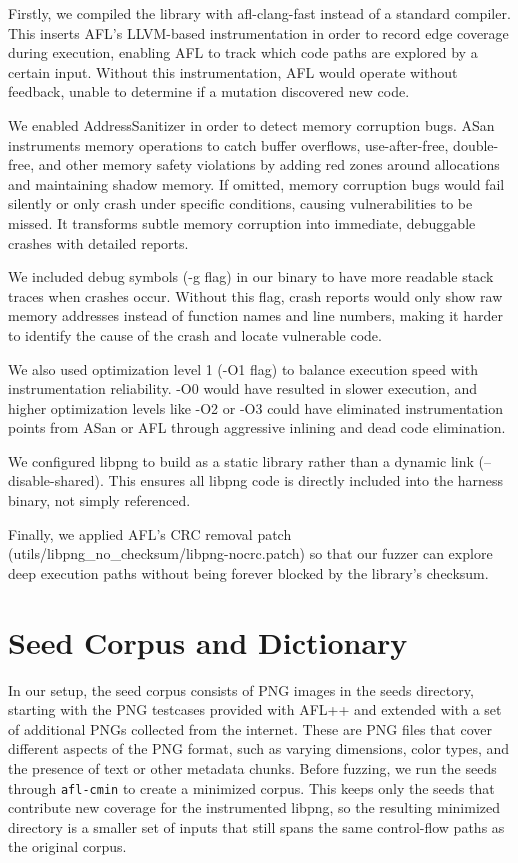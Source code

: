 Firstly, we compiled the library with afl-clang-fast instead of a standard compiler. This inserts AFL's LLVM-based instrumentation in order to record edge coverage during execution, enabling AFL to track which code paths are explored by a certain input. Without this instrumentation, AFL would operate without feedback, unable to determine if a mutation discovered new code.

We enabled AddressSanitizer in order to detect memory corruption bugs. ASan instruments memory operations to catch buffer overflows, use-after-free, double-free, and other memory safety violations by adding red zones around allocations and maintaining shadow memory. If omitted, memory corruption bugs would fail silently or only crash under specific conditions, causing vulnerabilities to be missed. It transforms subtle memory corruption into immediate, debuggable crashes with detailed reports.

We included debug symbols (-g flag) in our binary to have more readable stack traces when crashes occur. Without this flag, crash reports would only show raw memory addresses instead of function names and line numbers, making it harder to identify the cause of the crash and locate vulnerable code.

We also used optimization level 1 (-O1 flag) to balance execution speed with instrumentation reliability. -O0 would have resulted in slower execution, and higher optimization levels like -O2 or -O3 could have eliminated instrumentation points from ASan or AFL through aggressive inlining and dead code elimination.

 We configured libpng to build as a static library rather than a dynamic link (--disable-shared). This ensures all libpng code is directly included into the harness binary, not simply referenced.

 Finally, we applied AFL's CRC removal patch (utils/libpng\_no\_checksum/libpng-nocrc.patch) so that our fuzzer can explore deep execution paths without being forever blocked by the library's checksum. 



\section{Seed Corpus and Dictionary}

In our setup, the seed corpus consists of PNG images in the seeds directory, starting with the PNG testcases provided with AFL++ and extended with a set of additional PNGs collected from the internet. These are PNG files that cover different aspects of the PNG format, such as varying dimensions, color types, and the presence of text or other metadata chunks. Before fuzzing, we run the seeds through \texttt{afl-cmin} to create a minimized corpus. This keeps only the seeds that contribute new coverage for the instrumented libpng, so the resulting minimized directory is a smaller set of inputs that still spans the same control-flow paths as the original corpus.

